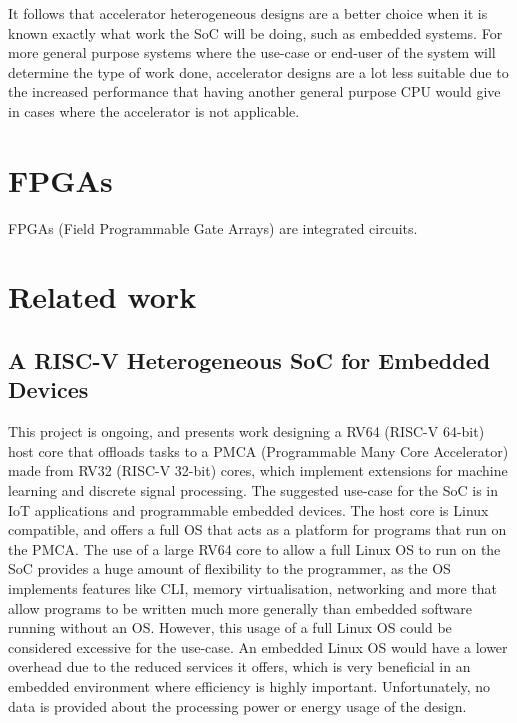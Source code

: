 It follows that accelerator heterogeneous designs are a better choice when it is known exactly what work the SoC will be doing, such as embedded systems. For more general purpose systems where the use-case or end-user of the system will determine the type of work done, accelerator designs are a lot less suitable due to the increased performance that having another general purpose CPU would give in cases where the accelerator is not applicable.

\section{FPGAs}
FPGAs (Field Programmable Gate Arrays) are integrated circuits.

\section{Related work}
\subsection{A RISC-V Heterogeneous SoC for Embedded Devices\cite{valenterisc}}
This project is ongoing, and presents work designing a RV64 (RISC-V 64-bit) host core that offloads tasks to a PMCA (Programmable Many Core Accelerator) made from RV32 (RISC-V 32-bit) cores, which implement extensions for machine learning and discrete signal processing. The suggested use-case for the SoC is in IoT applications and programmable embedded devices. The host core is Linux compatible, and offers a full OS that acts as a platform for programs that run on the PMCA. The use of a large RV64 core to allow a full Linux OS to run on the SoC provides a huge amount of flexibility to the programmer, as the OS implements features like CLI, memory virtualisation, networking and more that allow programs to be written much more generally than embedded software running without an OS. However, this usage of a full Linux OS could be considered excessive for the use-case. An embedded Linux OS would have a lower overhead due to the reduced services it offers, which is very beneficial in an embedded environment where efficiency is highly important. Unfortunately, no data is provided about the processing power or energy usage of the design.

